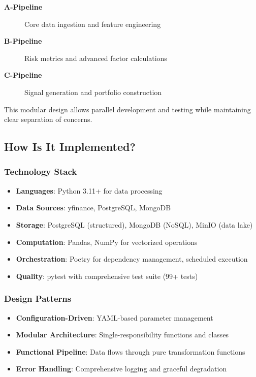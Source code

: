 \documentclass[11pt, a4paper, twoside]{article}
\begin{document}
\begin{description}
    \item[\textbf{A-Pipeline}] Core data ingestion and feature engineering
    \item[\textbf{B-Pipeline}] Risk metrics and advanced factor calculations
    \item[\textbf{C-Pipeline}] Signal generation and portfolio construction
\end{description}

This modular design allows parallel development and testing while maintaining clear separation of concerns.

\subsection{How Is It Implemented?}

\subsubsection{Technology Stack}

\begin{itemize}
    \item \textbf{Languages}: Python 3.11+ for data processing
    \item \textbf{Data Sources}: yfinance, PostgreSQL, MongoDB
    \item \textbf{Storage}: PostgreSQL (structured), MongoDB (NoSQL), MinIO (data lake)
    \item \textbf{Computation}: Pandas, NumPy for vectorized operations
    \item \textbf{Orchestration}: Poetry for dependency management, scheduled execution
    \item \textbf{Quality}: pytest with comprehensive test suite (99+ tests)
\end{itemize}

\subsubsection{Design Patterns}

\begin{itemize}
    \item \textbf{Configuration-Driven}: YAML-based parameter management
    \item \textbf{Modular Architecture}: Single-responsibility functions and classes
    \item \textbf{Functional Pipeline}: Data flows through pure transformation functions
    \item \textbf{Error Handling}: Comprehensive logging and graceful degradation
\end{itemize}
\end{document}
